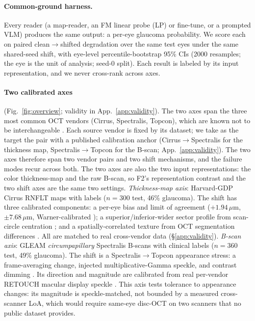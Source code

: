 \paragraph{Common-ground harness.} Every reader (a map-reader, an FM linear probe (LP) or fine-tune, or a prompted
VLM) produces the same output: a per-eye glaucoma probability. We score each on paired clean$\rightarrow$shifted
degradation over the same test eyes under the same shared-seed shift, with eye-level percentile-bootstrap 95\% CIs
(2000 resamples; the eye is the unit of analysis; seed-0 split). Each result is labeled by its input
representation, and we never cross-rank across axes.

\paragraph{Two calibrated axes} (Fig.~\ref{fig:overview}; validity in App.~\ref{app:validity}). The two axes span the
three most common OCT vendors (Cirrus, Spectralis, Topcon), which are known not to be interchangeable
\citep{buchser2012}. Each source vendor is fixed by its dataset; we take as the target the pair with a
published calibration anchor (Cirrus$\rightarrow$Spectralis for the thickness map, Spectralis$\rightarrow$Topcon for
the B-scan; App.~\ref{app:validity}). The two axes therefore span two vendor pairs and two shift mechanisms, and the
failure modes recur across both. The two axes are also the two input representations: the color thickness-map and the
raw B-scan, so F2's representation contrast and the two shift axes are the same two settings. \emph{Thickness-map
axis}: Harvard-GDP Cirrus RNFLT maps \citep{luo2023harvardgdp} with labels
($n{=}300$ test, 46\% glaucoma). The shift has three calibrated components: a per-eye bias and limit of agreement
($+1.94\,\mu$m, $\pm7.68\,\mu$m, Warner-calibrated \citep{warner2011loa, blandaltman1986}); a superior/inferior-wider
sector profile from scan-circle centration \citep{cheung2009scancircle}; and a spatially-correlated texture from OCT
segmentation differences \citep{mansberger2017segerrors}. All are matched to real cross-vendor data
(\S\ref{app:validity}). \emph{B-scan axis}: GLEAM \emph{circumpapillary} Spectralis
B-scans \citep{gleam2026} with clinical labels ($n{=}360$ test, 49\% glaucoma). The shift is a Spectralis$\rightarrow$Topcon
appearance stress: a frame-averaging change, injected multiplicative-Gamma speckle, and contrast dimming
\citep{schmitt1999speckle}. Its direction and magnitude are calibrated from real per-vendor RETOUCH macular display
speckle \citep{bogunovic2019retouch}. This axis tests tolerance to appearance changes: its magnitude is
speckle-matched, not bounded by a measured cross-scanner LoA, which would require same-eye disc-OCT on two scanners
that no public dataset provides.

